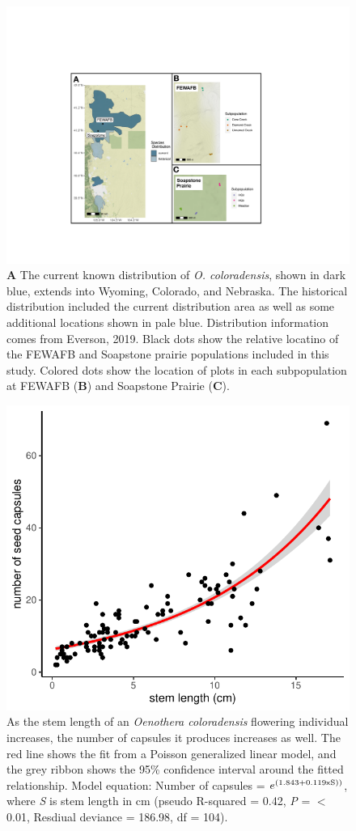 \documentclass[12pt, letterpaper]{article}
\begin{document}
\begin{figure}[h]
    \centering
    \includegraphics[width = 1\textwidth]{figures/COBP_mapFigure.pdf}
    \caption{\textbf{A} The current known distribution of \textit{O. coloradensis}, shown in dark blue, extends into Wyoming, Colorado, and Nebraska. The historical distribution included the current distribution area as well as some additional locations shown in pale blue. Distribution information comes from Everson, 2019. Black dots show the relative locatino of the FEWAFB and Soapstone prairie populations included in this study. Colored dots show the location of plots in each subpopulation at FEWAFB (\textbf{B}) and Soapstone Prairie (\textbf{C}).}
    \label{fig:plotMap}
\end{figure}

\begin{figure}[h]
  \centering
  \includegraphics[width=.7\textwidth]{seedRegressionPlot.pdf}
  \caption{As the stem length of an \textit{Oenothera coloradensis} flowering individual increases, the number of capsules it produces increases as well. The red line shows the fit from a Poisson generalized linear model, and the grey ribbon shows the 95\% confidence interval around the fitted relationship. Model equation: Number of capsules = $e^{(1.843 + 0.119\text{\textsf{x}}\text{S}))}$, where \textit{S} is stem length in cm (pseudo R-squared = 0.42, \textit{P} = $<$ 0.01, Resdiual deviance = 186.98, df = 104).  }
  \label{fig:seedRegression}
\end{figure} 
\end{document}
